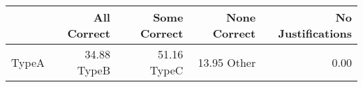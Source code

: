 \begin{tabular}{lrrrr}
\toprule
 & All Correct & Some Correct & None Correct & No Justifications \\
\midrule
TypeA & 34.88%
TypeB & 51.16%
TypeC & 13.95%
Other & 0.00%
\bottomrule
\end{tabular}
